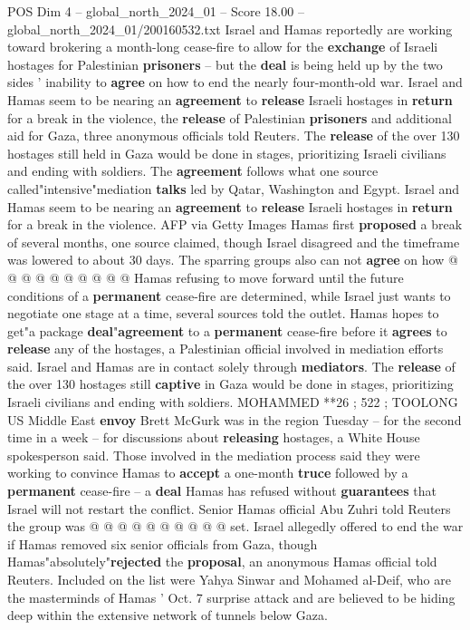 \begin{textsample}{POS Dim 4 – global\_north\_2024\_01 – Score 18.00 – global\_north\_2024\_01/200160532.txt}  \label{ex:f4_pos_337}
Israel and Hamas reportedly are working toward brokering a month-long cease-fire to allow for the \textbf{exchange} of Israeli hostages for Palestinian \textbf{prisoners} -- but the \textbf{deal} is being held up by the two sides ' inability to \textbf{agree} on how to end the nearly four-month-old war.
Israel and Hamas seem to be nearing an \textbf{agreement} to \textbf{release} Israeli hostages in \textbf{return} for a break in the violence, the \textbf{release} of Palestinian \textbf{prisoners} and additional aid for Gaza, three anonymous officials told Reuters.
The \textbf{release} of the over 130 hostages still held in Gaza would be done in stages, prioritizing Israeli civilians and ending with soldiers.
The \textbf{agreement} follows what one source called"intensive"mediation \textbf{talks} led by Qatar, Washington and Egypt.
Israel and Hamas seem to be nearing an \textbf{agreement} to \textbf{release} Israeli hostages in \textbf{return} for a break in the violence.
AFP via Getty Images Hamas first \textbf{proposed} a break of several months, one source claimed, though Israel disagreed and the timeframe was lowered to about 30 days.
The sparring groups also can not \textbf{agree} on how @ @ @ @ @ @ @ @ @ @ Hamas refusing to move forward until the future conditions of a \textbf{permanent} cease-fire are determined, while Israel just wants to negotiate one stage at a time, several sources told the outlet.
Hamas hopes to get"a package \textbf{deal}"\textbf{agreement} to a \textbf{permanent} cease-fire before it \textbf{agrees} to \textbf{release} any of the hostages, a Palestinian official involved in mediation efforts said.
Israel and Hamas are in contact solely through \textbf{mediators}.
The \textbf{release} of the over 130 hostages still \textbf{captive} in Gaza would be done in stages, prioritizing Israeli civilians and ending with soldiers.
MOHAMMED **26 ; 522 ; TOOLONG US Middle East \textbf{envoy} Brett McGurk was in the region Tuesday -- for the second time in a week -- for discussions about \textbf{releasing} hostages, a White House spokesperson said.
Those involved in the mediation process said they were working to convince Hamas to \textbf{accept} a one-month \textbf{truce} followed by a \textbf{permanent} cease-fire -- a \textbf{deal} Hamas has refused without \textbf{guarantees} that Israel will not restart the conflict.
Senior Hamas official Abu Zuhri told Reuters the group was @ @ @ @ @ @ @ @ @ @ set.
Israel allegedly offered to end the war if Hamas removed six senior officials from Gaza, though Hamas"absolutely"\textbf{rejected} the \textbf{proposal}, an anonymous Hamas official told Reuters.
Included on the list were Yahya Sinwar and Mohamed al-Deif, who are the masterminds of Hamas ' Oct. 7 surprise attack and are believed to be hiding deep within the extensive network of tunnels below Gaza.

\end{textsample}
